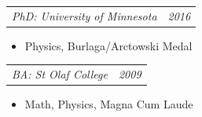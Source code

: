 \documentclass[12pt,letterpaper]{article}
\makeatletter
\newcommand{\headerpair}[2]{
    \begin{tabular*}{\linewidth}{l@{ \extracolsep{\fill} }r} {\large\emph{#1}} & {\large\emph{#2}}
    \end{tabular*}
}
\newcommand{\headerrow}[3]{\headerpair{#2: #1}{#3}}
\makeatother
\begin{document}
\setlength{\columnsep}{30pt}
\begin{multicols}{2}

\headerrow{University of Minnesota}{PhD}{2016}
\begin{itemize}
    \item Physics, Burlaga/Arctowski Medal
\end{itemize}

\columnbreak

\headerrow{St Olaf College}{BA}{2009}
\begin{itemize}
    \item Math, Physics, Magna Cum Laude
\end{itemize}

\end{multicols}
\end{document}
